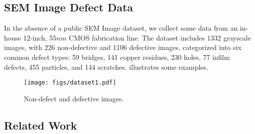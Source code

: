 \subsection{SEM Image Defect Data}

In the absence of a public SEM Image dataset, we collect some data from an in-house 12-inch, 55$nm$ CMOS fabrication line.
The dataset includes 1332 grayscale images, with 226 non-defective and 1106 defective images, categorized into six common defect types: 59 bridges, 141 copper residues, 230 holes, 77 infilm defects, 455 particles, and 144 scratches.  illustrates some examples.

\begin{figure}[h]
  \centering
  \texttt{[image: figs/dataset1.pdf]}
  \caption{Non-defect and defective images.} 
  \label{dataset}
\end{figure}


\subsection{Related Work}

